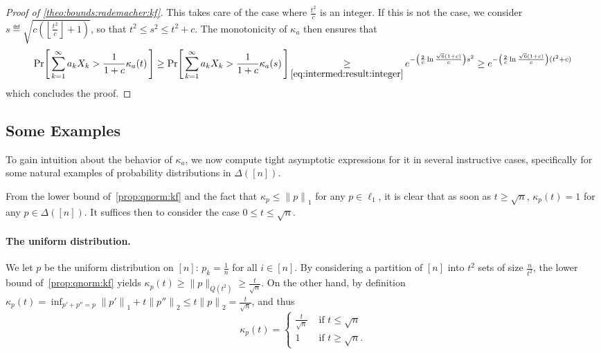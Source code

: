 \documentclass[11pt]{article}
\theoremstyle{remark}   	\newtheorem{remark}[theorem]{Remark}
\theoremstyle{definition}   	\newaliascnt{defn}{theorem}
\newenvironment{proofof}[1]{\begin{proof}[Proof of {#1}]}{\end{proof}}
\newcommand{\domain}[1][{[n]}]{\ensuremath{#1}\xspace} \newcommand{\distribs}[1]{\Delta\!\left(#1\right)} \newcommand{\yes}{{\sf{}yes}\xspace}
\newcommand{\proba}{\Pr}
\newcommand{\probaOf}[1]{\proba\!\left[\, #1\, \right]}
\newcommand{\norm}[1]{\lVert#1{\rVert}}
\newcommand{\normone}[1]{{\norm{#1}}_1}
\newcommand{\normtwo}[1]{{\norm{#1}}_2}
\newcommand{\flr}[1]{\left\lfloor #1 \right\rfloor}
\newcommand{\lp}[1][1]{\ell_{#1}}
\newcommand{\kf}[1]{\kappa_{#1}}
\begin{document}
\begin{proofof}{\autoref{theo:bounds:rademacher:kf}}
This takes care of the case where $\frac{t^2}{c}$ is an integer. If this is not the case, we consider
$s \eqdef \sqrt{c\left(\flr{\frac{t^2}{c}}+1\right)}$, so that $t^2 \leq s^2 \leq t^2+c$. The monotonicity of $\kf{a}$ then ensures that
\[
\probaOf{ \sum_{k=1}^\infty a_k X_k > \frac{1}{1+c} \kf{a}(t) } 
\geq \probaOf{ \sum_{k=1}^\infty a_k X_k > \frac{1}{1+c} \kf{a}(s) } 
\operatorname*{\geq}_{\eqref{eq:intermed:result:integer}} e^{-\left( \frac{2}{c}\ln\frac{\sqrt{6}(1+c)}{c}\right) s^2 }
\geq e^{-\left( \frac{2}{c}\ln\frac{\sqrt{6}(1+c)}{c}\right) (t^2+c) }
\]
which concludes the proof.
\end{proofof}

\subsection{Some Examples}

To gain intuition about the behavior of $\kf{a}$, we now compute tight asymptotic expressions for it in several instructive cases, specifically for some natural examples of probability distributions in $\distribs{\domain}$.

From the lower bound of~\autoref{prop:qnorm:kf} and the fact that $\kf{p} \leq \normone{p}$ for any $p\in\lp[1]$, it is clear that as soon as $t\geq \sqrt{n}$,
$
    \kf{p}(t) = 1
$
for any $p\in\distribs{\domain}$. It suffices then to consider the case $0\leq t\leq \sqrt{n}$.

\paragraph{The uniform distribution.} We let $p$ be the uniform distribution on $[n]$: $p_k = \frac{1}{n}$ for all $i\in[n]$. By considering a partition of $[n]$ into $t^2$ sets of size $\frac{n}{t^2}$, the lower bound of~\autoref{prop:qnorm:kf} yields
$
\kf{p}(t) \geq \norm{p}_{Q(t^2)} \geq \frac{t}{\sqrt{n}}
$. On the other hand, by definition $\kf{p}(t) = \inf_{p'+p''=p} \normone{p'}+t\normtwo{p''} \leq t\normtwo{p} = \frac{t}{\sqrt{n}}$, and thus
\[
    \kf{p}(t) = \begin{cases}
    \frac{t}{\sqrt{n}} & \text{ if } t\leq \sqrt{n}\\
    1 & \text{ if } t\geq \sqrt{n}.
    \end{cases}
\]
\end{document}
